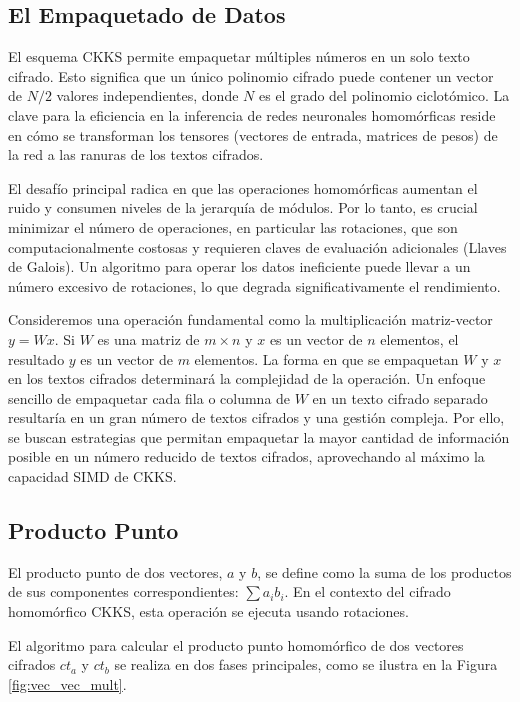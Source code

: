 \subsection{El Empaquetado de Datos}

El esquema CKKS permite empaquetar múltiples números en un solo texto cifrado. Esto significa que un único polinomio cifrado puede contener un vector de $N/2$ valores independientes, donde $N$ es el grado del polinomio ciclotómico. La clave para la eficiencia en la inferencia de redes neuronales homomórficas reside en cómo se transforman los tensores (vectores de entrada, matrices de pesos) de la red a las ranuras de los textos cifrados.

El desafío principal radica en que las operaciones homomórficas aumentan el ruido y consumen niveles de la jerarquía de módulos. Por lo tanto, es crucial minimizar el número de operaciones, en particular las rotaciones, que son computacionalmente costosas y requieren claves de evaluación adicionales (Llaves de Galois). Un algoritmo para operar los datos ineficiente puede llevar a un número excesivo de rotaciones, lo que degrada significativamente el rendimiento.

Consideremos una operación fundamental como la multiplicación matriz-vector $y = Wx$. Si $W$ es una matriz de $m \times n$ y $x$ es un vector de $n$ elementos, el resultado $y$ es un vector de $m$ elementos. La forma en que se empaquetan $W$ y $x$ en los textos cifrados determinará la complejidad de la operación. Un enfoque sencillo de empaquetar cada fila o columna de $W$ en un texto cifrado separado resultaría en un gran número de textos cifrados y una gestión compleja. Por ello, se buscan estrategias que permitan empaquetar la mayor cantidad de información posible en un número reducido de textos cifrados, aprovechando al máximo la capacidad SIMD de CKKS.

\subsection{Producto Punto}

El producto punto de dos vectores, $a$ y $b$, se define como la suma de los productos de sus componentes correspondientes: $\sum a_i b_i$. En el contexto del cifrado homomórfico CKKS, esta operación se ejecuta usando rotaciones.

El algoritmo para calcular el producto punto homomórfico de dos vectores cifrados $ct_a$ y $ct_b$ se realiza en dos fases principales, como se ilustra en la Figura \ref{fig:vec_vec_mult}.

